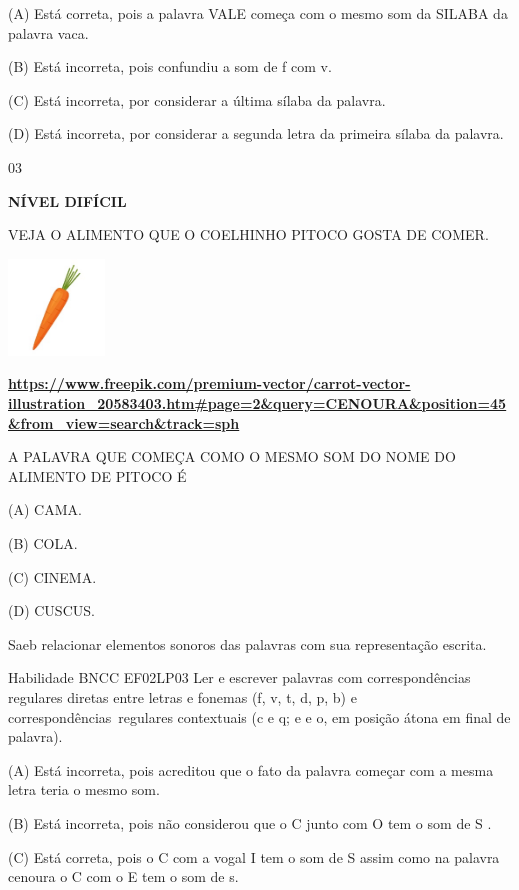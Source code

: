 {{\protect\hypertarget{_Hlk129501896}{}{}(A)
\protect\hypertarget{_Hlk129289891}{}{}Está correta, pois a palavra VALE
começa com o mesmo som da SILABA da palavra vaca.

(B) Está incorreta, pois confundiu a som de f com v.

(C) Está incorreta, por considerar a última sílaba da palavra.

(D) Está incorreta, por considerar a segunda letra da primeira sílaba da
palavra.

\num{03}

\textbf{NÍVEL DIFÍCIL}

VEJA O ALIMENTO QUE O COELHINHO PITOCO GOSTA DE COMER.

\includegraphics[width=1.01111in,height=1.01111in]{media/image149.jpeg}

\href{https://www.freepik.com/premium-vector/carrot-vector-illustration_20583403.htm\#page=2\&query=CENOURA\&position=45\&from_view=search\&track=sph}{\textbf{https://www.freepik.com/premium-vector/carrot-vector-illustration\_20583403.htm\#page=2\&query=CENOURA\&position=45\&from\_view=search\&track=sph}}

\protect\hypertarget{_Hlk129504325}{}{}A PALAVRA QUE COMEÇA COMO O MESMO
SOM DO NOME DO ALIMENTO DE PITOCO É

(A) CAMA.

(B) COLA.

(C) CINEMA.

(D) CUSCUS.

Saeb relacionar elementos sonoros das palavras com sua representação
escrita.

Habilidade BNCC EF02LP03 Ler e escrever palavras com correspondências
regulares diretas entre letras e fonemas (f, v, t, d, p, b) e
correspondências~regulares contextuais (c e q; e e o, em posição átona
em final de palavra).

\protect\hypertarget{_Hlk129366993}{}{}(A) Está incorreta, pois
acreditou que o fato da palavra começar com a mesma letra teria o mesmo
som.

(B) Está incorreta, pois não considerou que o C junto com O tem o som de
S .

(C) Está correta, pois o C com a vogal I tem o som de S assim como na
palavra cenoura o C com o E tem o som de s.

}}
